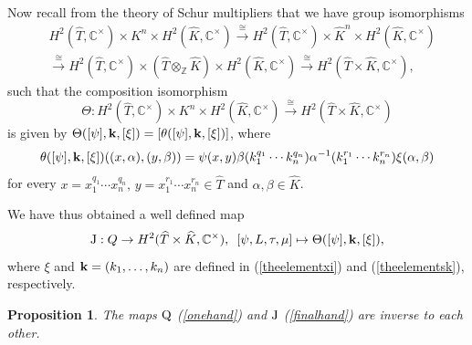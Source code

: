 \documentclass{amsart}
\newtheorem{proposition}[theorem]{Proposition}
\theoremstyle{definition}
\newcommand{\ot}{\otimes}
\numberwithin{equation}{section}
\begin{document}
Now recall from the theory of Schur multipliers that we have group isomorphisms
\begin{equation*}
\begin{split}
& H^2(\widehat{T},\mathbb{C}^{\times})\times K^n\times H^2(\widehat{K},\mathbb{C}^{\times})\xrightarrow{\cong} H^2(\widehat{T},\mathbb{C}^{\times})\times \widehat{K}^n\times H^2(\widehat{K},\mathbb{C}^{\times})\\
& \xrightarrow{\cong}H^2(\widehat{T},\mathbb{C}^{\times})\times (\widehat{T}\ot_{\mathbb{Z}} \widehat{K})\times H^2(\widehat{K},\mathbb{C}^{\times})\xrightarrow{\cong} H^2(\widehat{T}\times \widehat{K},\mathbb{C}^{\times}),
\end{split}
\end{equation*}
such that the composition isomorphism 
\begin{equation}\label{otherhand}
\Theta:H^2(\widehat{T},\mathbb{C}^{\times})\times K^n\times H^2(\widehat{K},\mathbb{C}^{\times})
\xrightarrow{\cong}H^2(\widehat{T}\times \widehat{K},\mathbb{C}^{\times})
\end{equation}
is given by $\Theta([\psi],{\bf k},[\xi])=[\theta([\psi],{\bf k},[\xi])]$, where 
\begin{equation}\label{explicitTheta}
\theta([\psi],{\bf k},[\xi])((x,\alpha),(y,\beta))=\psi(x,y)\beta(k_1^{q_1}\cdots k_n^{q_n})\alpha^{-1}(k_1^{r_1}\cdots k_n^{r_n})\xi(\alpha,\beta)
\end{equation}
for every $x=x_1^{q_1}\cdots x_n^{q_n},\,y=x_1^{r_1}\cdots x_n^{r_n}\in \widehat{T}$ and $\alpha,\beta\in \widehat{K}$.

We have thus obtained a well defined map
\begin{equation}\label{finalhand}
{\rm J}:Q\to H^2(\widehat{T}\times \widehat{K},\mathbb{C}^{\times}),\,\,\,[\psi,L,\tau,\mu]\mapsto \Theta([\psi],{\bf k},[\xi]),
\end{equation}
where $\xi$ and ${\bf k}=(k_1,\dots,k_n)$ are defined in (\ref{theelementxi}) and (\ref{theelementsk}), respectively.

\begin{proposition} 
The maps ${\rm Q}$ (\ref{onehand}) and ${\rm J}$ (\ref{finalhand}) are inverse to each other.
\end{proposition}
\end{document}
